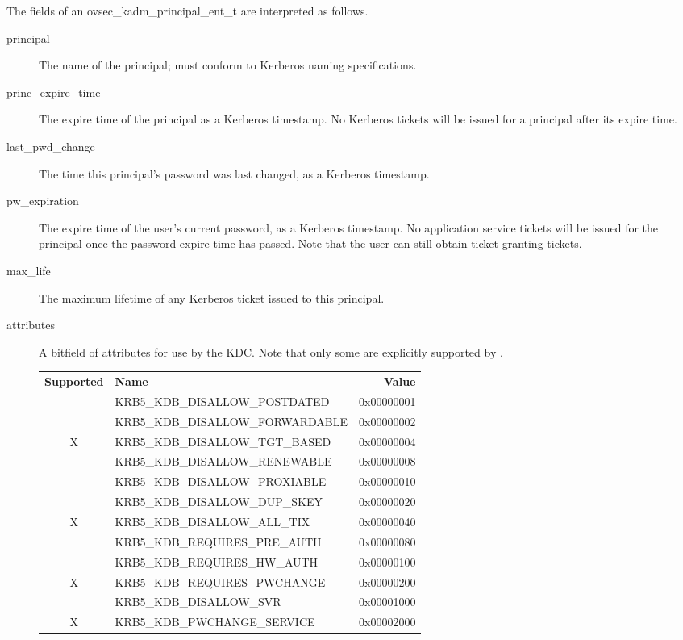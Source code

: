 The fields of an ovsec_kadm_principal_ent_t are interpreted as
follows.

\begin{description}
\item[principal] The name of the principal; must conform to Kerberos
naming specifications.

\item[princ_expire_time] The expire time of the principal as a Kerberos
timestamp.  No Kerberos tickets will be issued for a principal after
its expire time.

\item[last_pwd_change] The time this principal's password was last
changed, as a Kerberos timestamp.

\item[pw_expiration] The expire time of the user's current password, as a
Kerberos timestamp.  No application service tickets will be issued for the
principal once the password expire time has passed.  Note that the
user can still obtain ticket-granting tickets.

\item[max_life] The maximum lifetime of any Kerberos ticket issued to
this principal.

\item[attributes] A bitfield of attributes for use by the KDC.  
Note that only some are explicitly supported by \secure{}.

\begin{tabular}{clr}
{\bf Supported} & {\bf Name} & {\bf Value} \\
  & KRB5_KDB_DISALLOW_POSTDATED     & 0x00000001 \\
  & KRB5_KDB_DISALLOW_FORWARDABLE   & 0x00000002 \\
X & KRB5_KDB_DISALLOW_TGT_BASED     & 0x00000004 \\
  & KRB5_KDB_DISALLOW_RENEWABLE     & 0x00000008 \\
  & KRB5_KDB_DISALLOW_PROXIABLE     & 0x00000010 \\
  & KRB5_KDB_DISALLOW_DUP_SKEY      & 0x00000020 \\
X & KRB5_KDB_DISALLOW_ALL_TIX       & 0x00000040 \\
  & KRB5_KDB_REQUIRES_PRE_AUTH      & 0x00000080 \\
  & KRB5_KDB_REQUIRES_HW_AUTH       & 0x00000100 \\
X & KRB5_KDB_REQUIRES_PWCHANGE      & 0x00000200 \\
  & KRB5_KDB_DISALLOW_SVR           & 0x00001000 \\
X & KRB5_KDB_PWCHANGE_SERVICE       & 0x00002000
\end{tabular}


\end{description}
